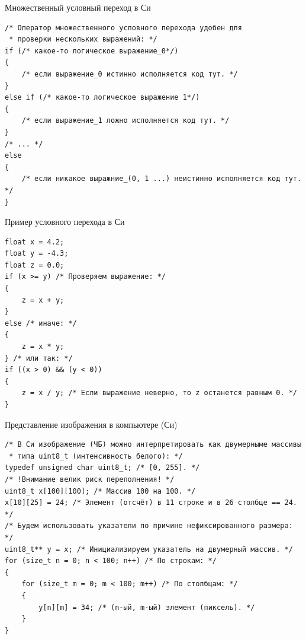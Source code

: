 \documentclass{beamer}
\begin{document}
    \begin{frame}[fragile]{Множественный условный переход в Си}
        \begin{verbatim}
/* Оператор множественного условного перехода удобен для 
 * проверки нескольких выражений: */
if (/* какое-то логическое выражение_0*/)
{
    /* если выражение_0 истинно исполняется код тут. */
}
else if (/* какое-то логическое выражение 1*/)
{
    /* если выражение_1 ложно исполняется код тут. */
}
/* ... */
else
{
    /* если никакое выражние_(0, 1 ...) неистинно исполняется код тут. */
}
        \end{verbatim}
    \end{frame}
    \begin{frame}[fragile]{Пример условного перехода в Си}
        \begin{verbatim}
float x = 4.2;
float y = -4.3;
float z = 0.0;
if (x >= y) /* Проверяем выражение: */
{
    z = x + y;
}
else /* иначе: */
{
    z = x * y;
} /* или так: */
if ((x > 0) && (y < 0))
{
    z = x / y; /* Если выражение неверно, то z останется равным 0. */
}
        \end{verbatim}
    \end{frame}
    \begin{frame}[fragile]{Представление изображения в компьютере (Си)}
        \begin{verbatim}
/* В Си изображение (ЧБ) можно интерпретировать как двумерныме массивы
 * типа uint8_t (интенсивность белого): */
typedef unsigned char uint8_t; /* [0, 255]. */
/* !Внимание велик риск переполнения! */
uint8_t x[100][100]; /* Массив 100 на 100. */
x[10][25] = 24; /* Элемент (отсчёт) в 11 строке и в 26 столбце == 24. */
/* Будем использовать указатели по причине нефиксированного размера: */
uint8_t** y = x; /* Инициализируем указатель на двумерный массив. */
for (size_t n = 0; n < 100; n++) /* По строкам: */
{
    for (size_t m = 0; m < 100; m++) /* По столбцам: */
    {
        y[n][m] = 34; /* (n-ый, m-ый) элемент (пиксель). */
    }
}
        \end{verbatim}
    \end{frame}
\end{document}

